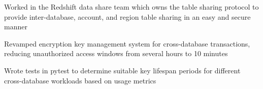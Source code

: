 \begin{cvitemize}
\item Worked in the Redshift data share team which owns the table sharing protocol to provide inter-database, account, and region table sharing in an easy and secure manner
\item Revamped encryption key management system for cross-database transactions, reducing unauthorized access windows from several hours to 10 minutes
\item Wrote tests in pytest
 to determine suitable key lifespan periods for different cross-database workloads based on usage metrics
\end{cvitemize}